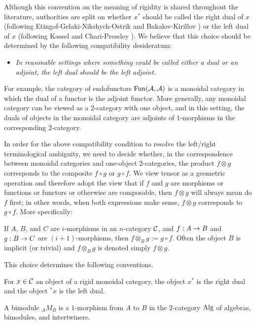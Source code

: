 \documentclass{amsart}
\begin{document}
Although this convention on the meaning of rigidity is shared throughout the literature, authorities are split on whether $x^*$ should be called the right dual of $x$ (following Etingof-Gelaki-Nikshych-Ostrik \cite{EGNO} and Bakalov-Kirillov \cite{MR1797619})  or the left dual of $x$ (following Kassel \cite{MR1321145} and Chari-Pressley \cite{MR1358358}).  We believe that this choice should be determined by the following compatibility desideratum: 
\begin{itemize}
\item[]
	\emph{In reasonable settings where something could be called either a dual or an adjoint, the left dual should be the left adjoint.}
\end{itemize}

\nid For example, the category of endofunctors $\operatorname{Fun}(\mathcal A, \mathcal A)$ is a monoidal category in which the dual of a functor is the adjoint functor.  More generally, any monoidal category can be viewed as a $2$-category with one object, and in this setting, the duals of objects in the monoidal category are adjoints of $1$-morphisms in the corresponding $2$-category.  

In order for the above compatibility condition to resolve the left/right terminological ambiguity, we need to decide whether, in the correspondence between monoidal categories and one-object 2-categories, the product $f \otimes g$ corresponds to the composite $f \circ g$ or $g \circ f$.  We view tensor as a geometric operation and therefore adopt the view that if $f$ and $g$ are morphisms or functions or functors or otherwise are composable, then $f \otimes g$ will always mean do $f$ first; in other words, when both expressions make sense, $f \otimes g$ corresponds to $g \circ f$.  More specifically:

\begin{definition} \label{def-tensorcomp}
If $A$, $B$, and $C$ are $i$-morphisms in an $n$-category $\mathcal C$, and $f: A \rightarrow B$ and $g: B \rightarrow C$ are $(i+1)$-morphisms, then $f \otimes_B g := g \circ f$.  Often the object $B$ is implicit (or trivial) and $f \otimes_B g$ is denoted simply $f \otimes g$.
\end{definition}

This choice determines the following conventions.
\begin{definition}
For $x \in \mathcal C$ an object of a rigid monoidal category, the object $x^*$ is the right dual and the object ${}^*x$ is the left dual.
\end{definition}
\begin{definition}
A bimodule ${}_A M_B$ is a $1$-morphism from $A$ to $B$ in the $2$-category $\mathrm{Alg}$ of algebras, bimodules, and intertwiners.
\end{definition}
\end{document}
